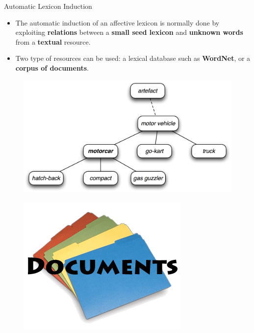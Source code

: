 \begin{frame}{Automatic Lexicon Induction}
\begin{scriptsize}

\begin{itemize} 
 \item The automatic induction of an affective lexicon is normally done by exploiting \textbf{relations} between a \textbf{small seed lexicon} and \textbf{unknown words} from a \textbf{textual} resource.
\item  Two type of resources can be used: a lexical database such as \textbf{WordNet}, or a \textbf{corpus of documents}. 
\end{itemize}



\begin{figure}[h!]
	\centering
	\includegraphics[scale=0.3]{pics/wordnet.png}
\end{figure}

\begin{figure}[h!]
	\centering
	\includegraphics[scale=0.2]{pics/documents.jpg}
\end{figure}





\end{scriptsize}
\end{frame}




